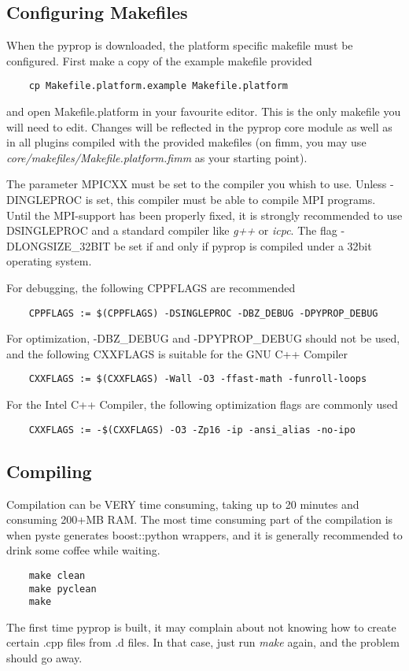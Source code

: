 \subsection*{Configuring Makefiles}
When the pyprop is downloaded, the platform specific makefile must be configured. First make
a copy of the example makefile provided
\begin{verbatim}
	cp Makefile.platform.example Makefile.platform
\end{verbatim}
and open Makefile.platform in your favourite editor. This is the only makefile you will need to edit. 
Changes will be reflected in the pyprop core module as well as in all plugins compiled with the provided
makefiles (on fimm, you may use \textit{core/makefiles/Makefile.platform.fimm} as your starting point).

The parameter MPICXX must be set to the compiler you whish to use. Unless -DINGLEPROC is set, this compiler
must be able to compile MPI programs. Until the MPI-support has been properly fixed, it is strongly recommended
to use \-DSINGLEPROC and a standard compiler like \textit{g++} or \textit{icpc}.
The flag -DLONGSIZE\_32BIT be set if and only if pyprop is compiled under a 32bit operating system.

For debugging, the following CPPFLAGS are recommended
\begin{verbatim}
	CPPFLAGS := $(CPPFLAGS) -DSINGLEPROC -DBZ_DEBUG -DPYPROP_DEBUG
\end{verbatim}
For optimization, -DBZ\_DEBUG and -DPYPROP\_DEBUG should not be used, and the following
CXXFLAGS is suitable for the GNU C++ Compiler
\begin{verbatim}
	CXXFLAGS := $(CXXFLAGS) -Wall -O3 -ffast-math -funroll-loops
\end{verbatim}
For the Intel C++ Compiler, the following optimization flags are commonly used
\begin{verbatim}
	CXXFLAGS := -$(CXXFLAGS) -O3 -Zp16 -ip -ansi_alias -no-ipo
\end{verbatim}

\subsection*{Compiling}
Compilation can be VERY time consuming, taking up to 20 minutes and consuming 200+MB RAM. 
The most time consuming part of the compilation is when pyste generates boost::python wrappers, and
it is generally recommended to drink some coffee while waiting.
\begin{verbatim}
	make clean
	make pyclean
	make
\end{verbatim}
The first time pyprop is built, it may complain about not knowing how to create certain .cpp files from
.d files. In that case, just run \textit{make} again, and the problem should go away.

